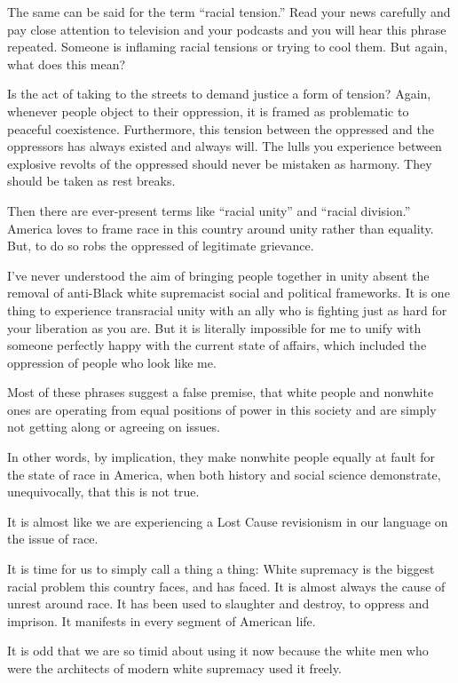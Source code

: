 The same can be said for the term ``racial tension.'' Read your news
carefully and pay close attention to television and your podcasts and
you will hear this phrase repeated. Someone is inflaming racial tensions
or trying to cool them. But again, what does this mean?

Is the act of taking to the streets to demand justice a form of tension?
Again, whenever people object to their oppression, it is framed as
problematic to peaceful coexistence. Furthermore, this tension between
the oppressed and the oppressors has always existed and always will. The
lulls you experience between explosive revolts of the oppressed should
never be mistaken as harmony. They should be taken as rest breaks.

Then there are ever-present terms like ``racial unity'' and ``racial
division.'' America loves to frame race in this country around unity
rather than equality. But, to do so robs the oppressed of legitimate
grievance.

I've never understood the aim of bringing people together in unity
absent the removal of anti-Black white supremacist social and political
frameworks. It is one thing to experience transracial unity with an ally
who is fighting just as hard for your liberation as you are. But it is
literally impossible for me to unify with someone perfectly happy with
the current state of affairs, which included the oppression of people
who look like me.

Most of these phrases suggest a false premise, that white people and
nonwhite ones are operating from equal positions of power in this
society and are simply not getting along or agreeing on issues.

In other words, by implication, they make nonwhite people equally at
fault for the state of race in America, when both history and social
science demonstrate, unequivocally, that this is not true.

It is almost like we are experiencing a Lost Cause revisionism in our
language on the issue of race.

It is time for us to simply call a thing a thing: White supremacy is the
biggest racial problem this country faces, and has faced. It is almost
always the cause of unrest around race. It has been used to slaughter
and destroy, to oppress and imprison. It manifests in every segment of
American life.

It is odd that we are so timid about using it now because the white men
who were the architects of modern white supremacy used it freely.

